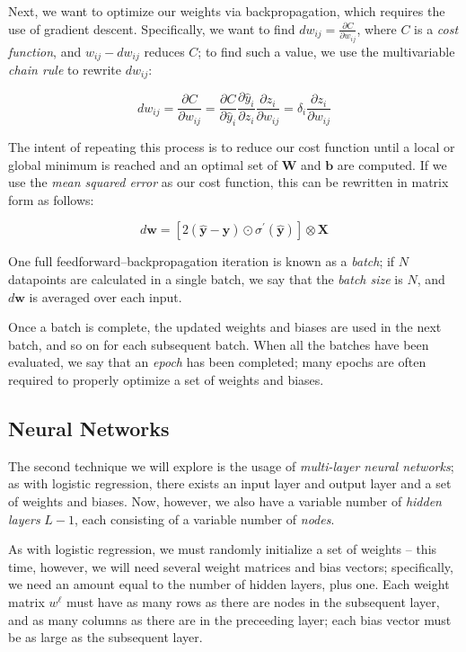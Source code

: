 \documentclass[a4paper,10pt,english]{article}
\begin{document}
\begin{multicols*}{2}
Next, we want to optimize our weights via backpropagation, which requires the use of gradient descent.  Specifically, we want to find $dw_{ij} = \frac{\partial C}{\partial w_{ij}}$, where $C$ is a \textit{cost function}, and $w_{ij} - dw_{ij}$ reduces $C$; to find such a value, we use the multivariable \textit{chain rule} to rewrite $dw_{ij}$:

\begin{equation*}
dw_{ij} = \frac{\partial C}{\partial w_{ij}} = \frac{\partial C}{\partial \hat{y}_i} \frac{\partial \hat{y}_i}{\partial z_i} \frac{\partial z_i}{\partial w_{ij}} = \delta_i \frac{\partial z_i}{\partial w_{ij}}
\end{equation*}

The intent of repeating this process is to reduce our cost function until a local or global minimum is reached and an optimal set of $\mathbf{W}$ and $\mathbf{b}$ are computed.  If we use the \textit{mean squared error} as our cost function, this can be rewritten in matrix form as follows:

\begin{equation}
\label{eq_backprop_output}
d\mathbf{w} = [2(\hat{\mathbf{y}} - \mathbf{y}) \odot \sigma^\prime(\hat{\mathbf{y}})] \otimes \mathbf{X}
\end{equation}

One full feedforward–backpropagation iteration is known as a \textit{batch}; if $N$ datapoints are calculated in a single batch, we say that the \textit{batch size} is $N$, and $d\mathbf{w}$ is averaged over each input.

Once a batch is complete, the updated weights and biases are used in the next batch, and so on for each subsequent batch. When all the batches have been evaluated, we say that an \textit{epoch} has been completed; many epochs are often required to properly optimize a set of weights and biases.

\subsection*{Neural Networks}

The second technique we will explore is the usage of \textit{multi-layer neural networks}; as with logistic regression, there exists an input layer and output layer and a set of weights and biases.  Now, however, we also have a variable number of \textit{hidden layers} $L-1$, each consisting of a variable number of \textit{nodes}.

As with logistic regression, we must randomly initialize a set of weights – this time, however, we will need several weight matrices and bias vectors; specifically, we need an amount equal to the number of hidden layers, plus one.  Each weight matrix $w^\ell$ must have as many rows as there are nodes in the subsequent layer, and as many columns as there are in the preceeding layer; each bias vector must be as large as the subsequent layer.


\end{multicols*}
\end{document}
